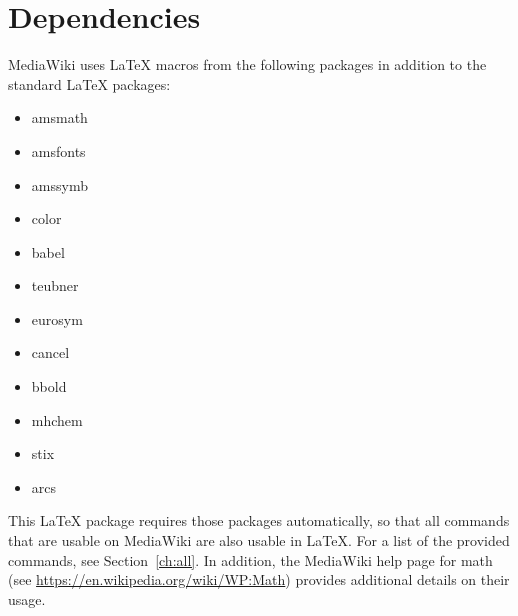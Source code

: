 \section{Dependencies}\label{ch:dependencies}

MediaWiki uses LaTeX macros from the following packages in addition to the standard LaTeX packages:
\begin{itemize}
\item {amsmath}
\item {amsfonts}
\item {amssymb}
\item {color}
\item {babel}
\item {teubner}
\item {eurosym}
\item {cancel}
\item {bbold}
\item {mhchem}
\item {stix}
\item {arcs}
\end{itemize}

This LaTeX package requires those packages automatically, so that all commands that are usable on MediaWiki are also usable in LaTeX.
For a list of the provided commands, see Section~\ref{ch:all}.
In addition, the MediaWiki help page for math (see \url{https://en.wikipedia.org/wiki/WP:Math}) provides additional details on their usage.